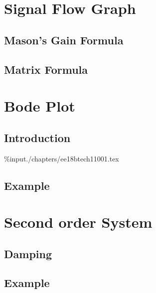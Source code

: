 \documentclass[journal,12pt,twocolumn]{IEEEtran}
\begin{document}
\section{Signal Flow Graph}

\subsection{Mason's Gain Formula}

%

\subsection{Matrix Formula}

%


%

\section{Bode Plot}

\subsection{Introduction}

\%input{./chapters/ee18btech11001.tex}

\subsection{Example}

%

\section{Second order System}

\subsection{Damping}

%

\subsection{Example}
\end{document}
